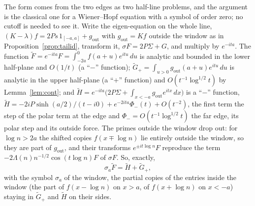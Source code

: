 \documentclass[11pt]{article}
\theoremstyle{definition}
\theoremstyle{remark}
\begin{document}
The form comes from the two edges as two half-line problems, and the argument is the classical one for a Wiener--Hopf equation with a symbol of order zero; no cutoff is needed to see it. Write the eigen-equation on the whole line, $(K-\lambda)f=2Ps\,1_{[-a,a]}+g_{\mathrm{out}}$ with $g_{\mathrm{out}}=Kf$ outside the window as in Proposition~\ref{prop:tailid}, transform it, $\sigma F=2P\Sigma+G$, and multiply by $e^{-ita}$. The function $\tilde F=e^{-ita}F=\int_{-2a}^0f(a+u)e^{itu}\,du$ is analytic and bounded in the lower half-plane and $O(1/t)$ (a ``$-$'' function); $\tilde G_+=\int_{u>0}g_{\mathrm{out}}(a+u)e^{itu}\,du$ is analytic in the upper half-plane (a ``$+$'' function) and $O(t^{-1}\log^{1/2}t)$ by Lemma~\ref{lem:cont}; and $\tilde H=e^{-ita}\big(2P\Sigma+\int_{x<-a}g_{\mathrm{out}}e^{itx}\,dx\big)$ is a ``$-$'' function, $\tilde H=-2iP\sinh(a/2)/(t-i0)+e^{-2ita}\Phi_-(t)+O(t^{-2})$, the first term the step of the polar term at the edge and $\Phi_-=O(t^{-1}\log^{1/2}t)$ the far edge, its polar step and its outside force. The primes outside the window drop out: for $\log n>2a$ the shifted copies $f(x\mp\log n)$ lie entirely outside the window, so they are part of $g_{\mathrm{out}}$, and their transforms $e^{\pm it\log n}F$ reproduce the term $-2\Lambda(n)n^{-1/2}\cos(t\log n)F$ of $\sigma F$. So, exactly,
\begin{equation}\label{eq:whequation}
\sigma_a\tilde F=\tilde H+\tilde G_+ ,
\end{equation}
with the symbol $\sigma_a$ of the window, the partial copies of the entries inside the window (the part of $f(x-\log n)$ on $x>a$, of $f(x+\log n)$ on $x<-a$) staying in $\tilde G_+$ and $\tilde H$ on their sides.
\end{document}
